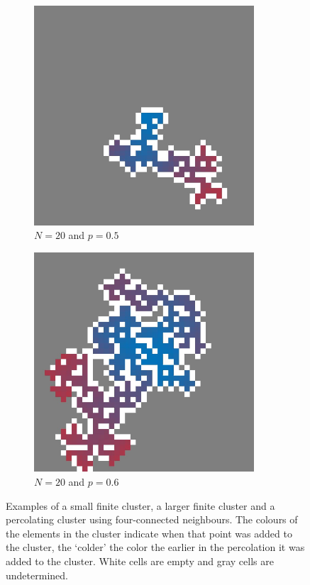 \begin{figure}
\begin{subfigure}{0.27\textwidth}
		\includegraphics[width=0.9\textwidth]{./img/fancy_cluster_N20_p5_rng_8}
		\caption{$N = 20$ and $p = 0.5$}
		\label{fig:method:fin_inf:finiteLarge}
	\end{subfigure}	
	\begin{subfigure}{0.27\textwidth}
		\centering
		\includegraphics[width=0.9\textwidth]{./img/fancy_cluster_N20_p6_rng_5}
		\caption{$N = 20$ and $p = 0.6$}
		\label{fig:method:fin_inf:infinite}
	\end{subfigure}		
	\caption{Examples of  a small finite cluster,  a larger finite cluster and  a percolating cluster using four-connected neighbours. The colours of the elements in the cluster indicate when that point was added to the cluster, the `colder' the color the earlier in the percolation it was added to the cluster. White cells are empty and gray cells are undetermined. }
	\label{fig:method:fin_inf}
\end{figure}

